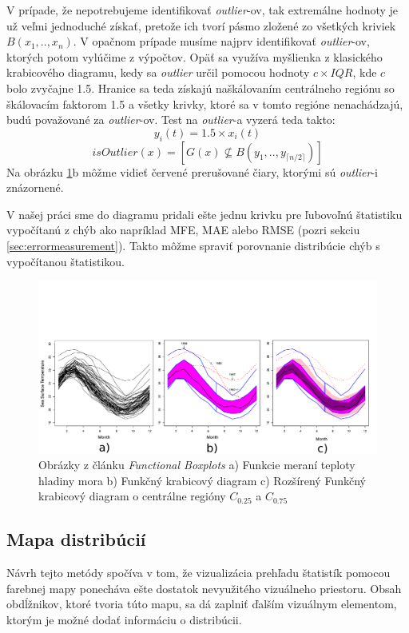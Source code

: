 V prípade, že nepotrebujeme identifikovať \textit{outlier}-ov, tak extremálne hodnoty je už veľmi jednoduché získať, pretože ich tvorí pásmo zložené zo všetkých kriviek $ B(x_{1}, .., x_{n}) $. V opačnom prípade musíme najprv identifikovať \textit{outlier}-ov, ktorých potom vylúčime z výpočtov. Opäť sa využíva myšlienka z klasického krabicového diagramu, kedy sa \textit{outlier} určil pomocou hodnoty $ c \times IQR $, kde $ c $ bolo zvyčajne 1.5. Hranice sa teda získajú naškálovaním centrálneho regiónu so škálovacím faktorom 1.5 a všetky krivky, ktoré sa v tomto regióne nenachádzajú, budú považované za \textit{outlier}-ov. Test na \textit{outlier}-a vyzerá teda takto:
\[	y_{i}(t) = 1.5 \times x_{i}(t) \]
\[	isOutlier(x) = [ G(x) \nsubseteq B(y_{1},..,y_{\lceil n / 2 \rceil}) ] \]
Na obrázku \ref{fig:functionalboxplot}b môžme vidieť červené prerušované čiary, ktorými sú \textit{outlier}-i znázornené.

V našej práci sme do diagramu pridali ešte jednu krivku pre ľubovoľnú štatistiku vypočítanú z chýb ako napríklad MFE, MAE alebo RMSE (pozri sekciu \ref{sec:errormeasurement}). Takto môžme spraviť porovnanie distribúcie chýb s vypočítanou štatistikou.


\begin{figure}
	\centering
	\hspace*{-0.9in}
	\includegraphics[width = 7.5in]{functionalboxplot}
	\caption{Obrázky z článku \textit{Functional Boxplots}  \cite{FunctionalBoxplot}  a) Funkcie meraní teploty hladiny mora b) Funkčný krabicový diagram c) Rozšírený Funkčný krabicový diagram o centrálne regióny $ C_{0.25} $ a $ C_{0.75} $ }
	\label{fig:functionalboxplot}
\end{figure}

\subsection{Mapa distribúcií} 
Návrh tejto metódy spočíva v tom, že vizualizácia prehľadu štatistík pomocou farebnej mapy ponecháva ešte dostatok nevyužitého vizuálneho priestoru. Obsah obdĺžnikov, ktoré tvoria túto mapu, sa dá zaplniť ďalším vizuálnym elementom, ktorým je možné dodať informáciu o distribúcii.

